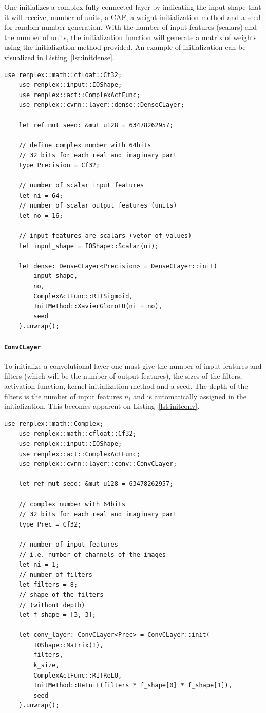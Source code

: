 One initializes a complex fully connected layer by indicating the input shape that it will receive, number of units, a \gls{CAF}, a weight initialization method and a seed for random number generation. With the number of input features (scalars) and the number of units, the initialization function will generate a matrix of weights using the initialization method provided. An example of initialization can be visualized in Listing~\ref{lst:initdense}.

\begin{lstlisting}[label=lst:initdense,caption=Initialization of a complex dense layer.]
	use renplex::math::cfloat::Cf32;
	use renplex::input::IOShape;
	use renplex::act::ComplexActFunc;
	use renplex::cvnn::layer::dense::DenseCLayer;
	
	let ref mut seed: &mut u128 = 63478262957;
	
	// define complex number with 64bits
	// 32 bits for each real and imaginary part
	type Precision = Cf32;
	
	// number of scalar input features
	let ni = 64;
	// number of scalar output features (units)
	let no = 16;
	
	// input features are scalars (vetor of values)
	let input_shape = IOShape::Scalar(ni);
	
	let dense: DenseCLayer<Precision> = DenseCLayer::init(
		input_shape, 
		no,
		ComplexActFunc::RITSigmoid, 
		InitMethod::XavierGlorotU(ni + no),
		seed
	).unwrap();
\end{lstlisting}

\paragraph{\texttt{ConvCLayer}}

To initialize a convolutional layer one must give the number of input features and filters (which will be the number of output features), the sizes of the filters, activation function, kernel initialization method and a seed.  The depth of the filters is the number of input features $ n_i $ and is automatically assigned in the initialization. This becomes apparent on Listing~\ref{lst:initconv}.

\begin{lstlisting}[label=lst:initconv,caption=Initialization of a complex convolutional layer.]
	use renplex::math::Complex;
	use renplex::math::cfloat::Cf32;
	use renplex::input::IOShape;
	use renplex::act::ComplexActFunc;
	use renplex::cvnn::layer::conv::ConvCLayer;
	
	let ref mut seed: &mut u128 = 63478262957;
	
	// complex number with 64bits
	// 32 bits for each real and imaginary part
	type Prec = Cf32;
	
	// number of input features
	// i.e. number of channels of the images
	let ni = 1;
	// number of filters
	let filters = 8;
	// shape of the filters
	// (without depth)
	let f_shape = [3, 3];
	
	let conv_layer: ConvCLayer<Prec> = ConvCLayer::init(
		IOShape::Matrix(1),
		filters,
		k_size,
		ComplexActFunc::RITReLU, 
		InitMethod::HeInit(filters * f_shape[0] * f_shape[1]),
		seed
	).unwrap();
\end{lstlisting}

